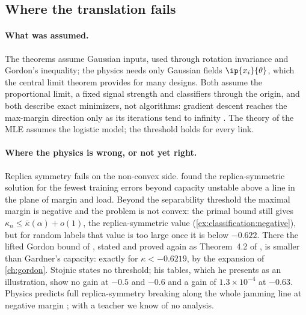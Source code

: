\begin{refsection}
\section{Where the translation fails}\label{sec:classification:fails}

\paragraph{What was assumed.} The theorems assume Gaussian inputs, used through rotation invariance and Gordon's inequality; the physics needs only Gaussian fields $\ip{x_i}{\theta}$, which the central limit theorem provides for many designs. Both assume the proportional limit, a fixed signal strength and classifiers through the origin, and both describe exact minimizers, not algorithms: gradient descent reaches the max-margin direction only as its iterations tend to infinity \parencite{SoudryEtAl2018}. The theory of the MLE assumes the logistic model; the threshold holds for every link.

\paragraph{Where the physics is wrong, or not yet right.} Replica symmetry fails on the non-convex side. \Textcite{GardnerDerrida1988} found the replica-symmetric solution for the fewest training errors beyond capacity unstable above a line in the plane of margin and load. Beyond the separability threshold the maximal margin is negative and the problem is not convex: the primal bound still gives $\kappa_n\le\bar\kappa(\alpha)+o(1)$, the replica-symmetric value (\cref{ex:classification:negative}), but for random labels that value is too large once it is below $-0.622$. There the lifted Gordon bound of \textcite{Stojnic2013b}, stated and proved again as Theorem~4.2 of \textcite{MontanariZhongZhou2024}, is smaller than Gardner's capacity: exactly for $\kappa<-0.6219$, by the expansion of \cref{ch:gordon}. Stojnic states no threshold; his tables, which he presents as an illustration, show no gain at $-0.5$ and $-0.6$ and a gain of $1.3\times10^{-4}$ at $-0.63$. Physics predicts full replica-symmetry breaking along the whole jamming line at negative margin \parencite{FranzEtAl2017}; with a teacher we know of no analysis.


\end{refsection}
